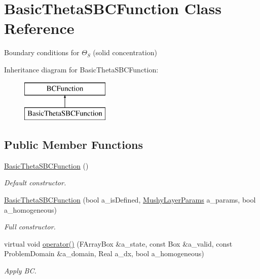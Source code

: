 \hypertarget{class_basic_theta_s_b_c_function}{\section{Basic\-Theta\-S\-B\-C\-Function Class Reference}
\label{class_basic_theta_s_b_c_function}
}


Boundary conditions for $\Theta_S$ (solid concentration)  


Inheritance diagram for Basic\-Theta\-S\-B\-C\-Function\-:\begin{figure}[H]
\begin{center}
\leavevmode
\includegraphics[height=2.000000cm]{class_basic_theta_s_b_c_function}
\end{center}
\end{figure}
\subsection*{Public Member Functions}
\begin{DoxyCompactItemize}
\item 
\hypertarget{class_basic_theta_s_b_c_function_abbee2ea704c697efcd149d535ec86f88}{\hyperlink{class_basic_theta_s_b_c_function_abbee2ea704c697efcd149d535ec86f88}{Basic\-Theta\-S\-B\-C\-Function} ()}\label{class_basic_theta_s_b_c_function_abbee2ea704c697efcd149d535ec86f88}

\begin{DoxyCompactList}\small\item\em Default constructor. \end{DoxyCompactList}\item 
\hypertarget{class_basic_theta_s_b_c_function_a75974dd00e7d56a5d93a3840bd042791}{\hyperlink{class_basic_theta_s_b_c_function_a75974dd00e7d56a5d93a3840bd042791}{Basic\-Theta\-S\-B\-C\-Function} (bool a\-\_\-is\-Defined, \hyperlink{class_mushy_layer_params}{Mushy\-Layer\-Params} a\-\_\-params, bool a\-\_\-homogeneous)}\label{class_basic_theta_s_b_c_function_a75974dd00e7d56a5d93a3840bd042791}

\begin{DoxyCompactList}\small\item\em Full constructor. \end{DoxyCompactList}\item 
\hypertarget{class_basic_theta_s_b_c_function_a6e7a43f6d568fcfaada2dd4c5f569b95}{virtual void \hyperlink{class_basic_theta_s_b_c_function_a6e7a43f6d568fcfaada2dd4c5f569b95}{operator()} (F\-Array\-Box \&a\-\_\-state, const Box \&a\-\_\-valid, const Problem\-Domain \&a\-\_\-domain, Real a\-\_\-dx, bool a\-\_\-homogeneous)}\label{class_basic_theta_s_b_c_function_a6e7a43f6d568fcfaada2dd4c5f569b95}

\begin{DoxyCompactList}\small\item\em Apply B\-C. \end{DoxyCompactList}\end{DoxyCompactItemize}

